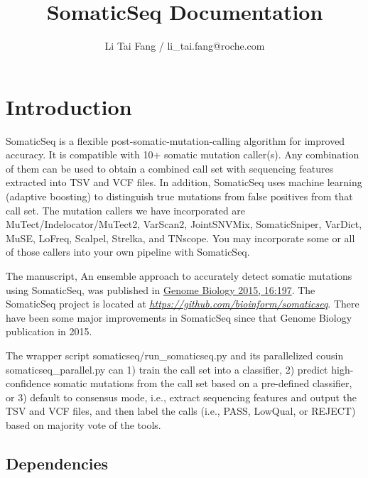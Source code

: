 \documentclass[10pt,letterpaper]{article}
\author{Li Tai Fang / li\_tai.fang@roche.com}
\title{SomaticSeq Documentation}
\begin{document}
\maketitle



\begin{sloppypar}




\tableofcontents



\section{Introduction} \label{Introduction}

SomaticSeq is a flexible post-somatic-mutation-calling algorithm for improved accuracy. It is compatible with 10+ somatic mutation caller(s). Any combination of them can be used to obtain a combined call set with sequencing features extracted into TSV and VCF files. In addition, SomaticSeq uses machine learning (adaptive boosting) to distinguish true mutations from false positives from that call set. The mutation callers we have incorporated are MuTect/Indelocator/MuTect2, VarScan2, JointSNVMix, SomaticSniper, VarDict, MuSE, LoFreq, Scalpel, Strelka, and TNscope. You may incorporate some or all of those callers into your own pipeline with SomaticSeq.

The manuscript, An ensemble approach to accurately detect somatic mutations using SomaticSeq, was published in \href{http://dx.doi.org/10.1186/s13059-015-0758-2}{Genome Biology 2015, 16:197}. 
The SomaticSeq project is located at \href{https://github.com/bioinform/somaticseq}{\textit{https://github.com/bioinform/somaticseq}}. 
There have been some major improvements in SomaticSeq since that Genome Biology publication in 2015. 

The wrapper script somaticseq/run\_somaticseq.py and its parallelized cousin somaticseq\_parallel.py can 1) train the call set into a classifier, 2) predict high-confidence somatic mutations from the call set based on a pre-defined classifier, or 3) default to consensus mode, i.e., extract sequencing features and output the TSV and VCF files, and then label the calls (i.e., PASS, LowQual, or REJECT) based on majority vote of the tools.

\subsection{Dependencies}


\end{sloppypar}
\end{document}
